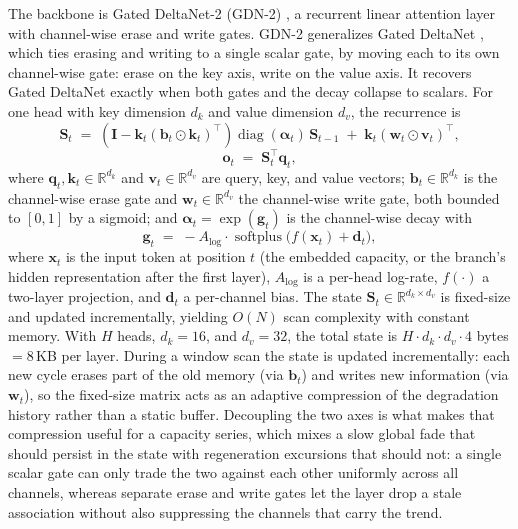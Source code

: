 The backbone is Gated DeltaNet-2 (GDN-2) \cite{ref_gdn2}, a
recurrent linear attention layer with channel-wise erase and write
gates. GDN-2 generalizes Gated DeltaNet \cite{ref_gdn}, which ties
erasing and writing to a single scalar gate, by moving each to its own
channel-wise gate: erase on the key axis, write on the value axis. It
recovers Gated DeltaNet exactly when both gates and the decay
collapse to scalars. For one head with key dimension $d_k$ and value dimension
$d_v$, the recurrence is
\begin{equation}
\label{eq:gdn2}
\mathbf{S}_t \;=\; \left( \mathbf{I} - \mathbf{k}_t(\mathbf{b}_t
\odot \mathbf{k}_t)^{\top} \right)
\operatorname{diag}(\boldsymbol{\alpha}_t)\, \mathbf{S}_{t-1}
\;+\; \mathbf{k}_t(\mathbf{w}_t \odot \mathbf{v}_t)^{\top},
\end{equation}
\begin{equation}
\label{eq:readout}
\mathbf{o}_t \;=\; \mathbf{S}_t^{\top}\mathbf{q}_t,
\end{equation}
where $\mathbf{q}_t,\mathbf{k}_t \in \mathbb{R}^{d_k}$ and
$\mathbf{v}_t \in \mathbb{R}^{d_v}$ are query, key, and value vectors;
$\mathbf{b}_t \in \mathbb{R}^{d_k}$ is the channel-wise erase gate and
$\mathbf{w}_t \in \mathbb{R}^{d_v}$ the channel-wise write gate, both
bounded to $[0,1]$ by a sigmoid; and
$\boldsymbol{\alpha}_t = \exp(\mathbf{g}_t)$ is the channel-wise decay
with
\begin{equation}
\mathbf{g}_t \;=\; -A_{\log}\cdot
\operatorname{softplus}\!\big( f(\mathbf{x}_t) + \mathbf{d}_t \big),
\end{equation}
where $\mathbf{x}_t$ is the input token at position $t$ (the embedded
capacity, or the branch's hidden representation after the first
layer), $A_{\log}$ is a per-head log-rate, $f(\cdot)$ a two-layer
projection, and $\mathbf{d}_t$ a per-channel bias. The state
$\mathbf{S}_t \in \mathbb{R}^{d_k \times d_v}$ is fixed-size and
updated incrementally, yielding $O(N)$ scan complexity with
constant memory. With $H$ heads, $d_k=16$, and $d_v=32$, the total
state is $H \cdot d_k \cdot d_v \cdot 4$ bytes $= 8$\,KB per layer.
During a window scan the state is updated incrementally: each new
cycle erases part of the old memory (via $\mathbf{b}_t$) and writes
new information (via $\mathbf{w}_t$), so the fixed-size matrix acts
as an adaptive compression of the degradation history rather than a
static buffer. Decoupling the two axes is what makes that compression
useful for a capacity series, which mixes a slow global fade that
should persist in the state with regeneration excursions that should
not: a single scalar gate can only trade the two against each other
uniformly across all channels, whereas separate erase and write gates
let the layer drop a stale association without also suppressing the
channels that carry the trend.


